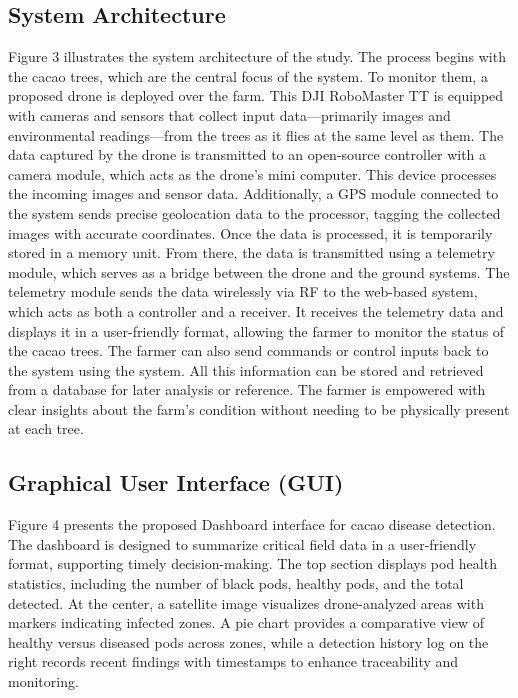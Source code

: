 	\subsection{System Architecture}
	Figure 3 illustrates the system architecture of the study. The process begins with the cacao trees, which are the central focus of the system. To monitor them, a proposed drone is deployed over the farm. This DJI RoboMaster TT is equipped with cameras and sensors that collect input data—primarily images and environmental readings—from the trees as it flies at the same level as them. The data captured by the drone is transmitted to an open-source controller with a camera module, which acts as the drone’s mini computer. This device processes the incoming images and sensor data. Additionally, a GPS module connected to the system sends precise geolocation data to the processor, tagging the collected images with accurate coordinates. Once the data is processed, it is temporarily stored in a memory unit. From there, the data is transmitted using a telemetry module, which serves as a bridge between the drone and the ground systems. The telemetry module sends the data wirelessly via RF to the web-based system, which acts as both a controller and a receiver. It receives the telemetry data and displays it in a user-friendly format, allowing the farmer to monitor the status of the cacao trees. The farmer can also send commands or control inputs back to the system using the system. All this information can be stored and retrieved from a database for later analysis or reference. The farmer is empowered with clear insights about the farm’s condition without needing to be physically present at each tree.
	
	\subsection{Graphical User Interface (GUI)}
	Figure 4 presents the proposed Dashboard interface for cacao disease detection. The dashboard is designed to summarize critical field data in a user-friendly format, supporting timely decision-making. The top section displays pod health statistics, including the number of black pods, healthy pods, and the total detected. At the center, a satellite image visualizes drone-analyzed areas with markers indicating infected zones. A pie chart provides a comparative view of healthy versus diseased pods across zones, while a detection history log on the right records recent findings with timestamps to enhance traceability and monitoring.
	
